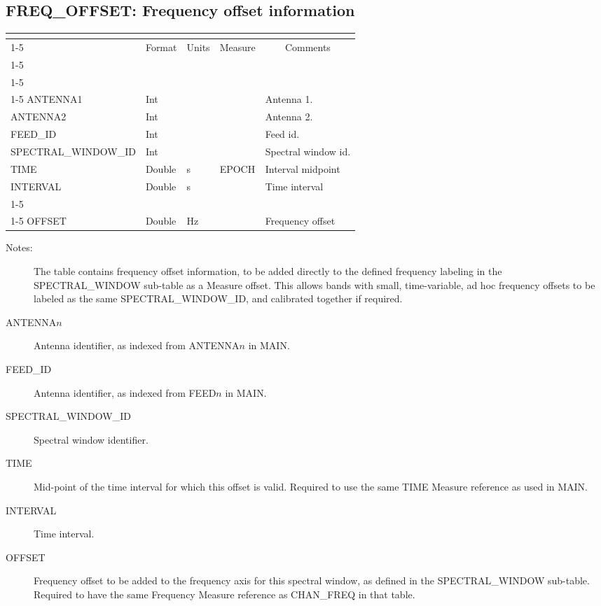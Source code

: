 \documentclass{article}
\newcommand{\defline}[1]{\cline{1-5}
\multicolumn{5}{|l|}{#1} \\
\cline{1-5}}
\newcommand{\definetable}[3][]
{
  \vfill\newpage
  \subsection{#2}
  \label{tbl:#1}
  \vspace{0.15in}
  \small
  \begin{tabular}{|l|p{1.25in}|l|p{.9in}|p{1.4in}|}
  \hline
  \multicolumn{5}{|c|}{\bf #1}\\
  \cline{1-5}
  \multicolumn{1}{|c|}{Name}&\multicolumn{1}{|c|}{Format}&
  \multicolumn{1}{|c|}{Units}&\multicolumn{1}{|c|}{Measure}&
  \multicolumn{1}{|c|}{Comments}\\
  \cline{1-5}
  #3
  \hline
  \end{tabular}
}
\begin{document}
\definetable{FREQ\_OFFSET: Frequency offset information}{
\defline{\bf Columns}
\defline{\em Key}
ANTENNA1  &   Int  & & & Antenna 1.\\
ANTENNA2  &   Int  & & & Antenna 2.\\
FEED\_ID     &   Int  & & & Feed id.\\
SPECTRAL\_WINDOW\_ID & Int & & & Spectral window id.\\
TIME & Double & s & EPOCH & Interval midpoint\\
INTERVAL & Double & s & & Time interval\\
\defline{\em Data}
OFFSET   &  Double & Hz &  & Frequency offset\\
}
\begin{description}

\item[Notes:] The table contains frequency offset information, to be
added directly to the defined frequency labeling in the
SPECTRAL\_WINDOW sub-table as a Measure offset. This allows bands with
small, time-variable, ad hoc frequency offsets to be labeled as the same
SPECTRAL\_WINDOW\_ID, and calibrated together if required.

\item[ANTENNA$n$] Antenna identifier, as indexed from ANTENNA$n$ in MAIN.

\item[FEED\_ID] Antenna identifier, as indexed from FEED$n$ in MAIN.

\item[SPECTRAL\_WINDOW\_ID] Spectral window identifier.

\item[TIME] Mid-point of the time interval for which this offset is valid.
Required to use the same TIME Measure reference as used in MAIN.

\item[INTERVAL] Time interval.

\item[OFFSET] Frequency offset to be added to the frequency axis for
this spectral window, as defined in the SPECTRAL\_WINDOW
sub-table. Required to have the same Frequency Measure reference as
CHAN\_FREQ in that table.

\end{description}
\end{document}
